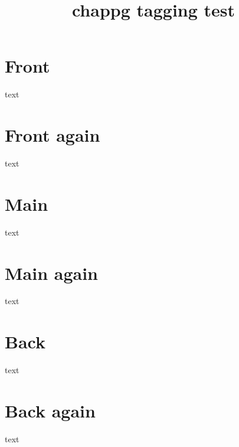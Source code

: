 \documentclass{book}
\title{chappg tagging test}
\begin{document}
\frontmatter
\chapter{Front}
text
\chapter{Front again}
text

\mainmatter
\chapter{Main}
text
\chapter{Main again}
text

\backmatter
{}
\chapter{Back}
text
\chapter{Back again}
text
\end{document}
